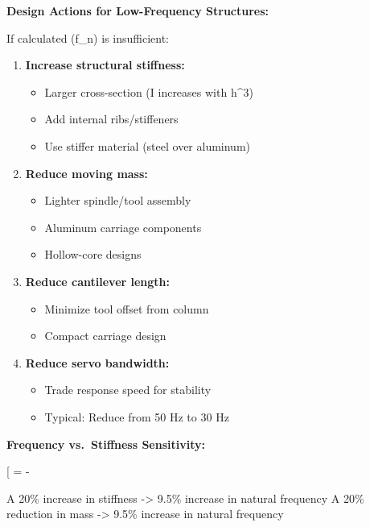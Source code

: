 \documentclass[
]{article}
\providecommand{\tightlist}{%
  \setlength{\itemsep}{0pt}\setlength{\parskip}{0pt}}
\begin{document}
\textbf{Design Actions for Low-Frequency Structures:}

If calculated (f\_n) is insufficient:

\begin{enumerate}
\def\labelenumi{\arabic{enumi}.}
\tightlist
\item
  \textbf{Increase structural stiffness:}

  \begin{itemize}
  \tightlist
  \item
    Larger cross-section (I increases with h\^{}3)
  \item
    Add internal ribs/stiffeners
  \item
    Use stiffer material (steel over aluminum)
  \end{itemize}
\item
  \textbf{Reduce moving mass:}

  \begin{itemize}
  \tightlist
  \item
    Lighter spindle/tool assembly
  \item
    Aluminum carriage components
  \item
    Hollow-core designs
  \end{itemize}
\item
  \textbf{Reduce cantilever length:}

  \begin{itemize}
  \tightlist
  \item
    Minimize tool offset from column
  \item
    Compact carriage design
  \end{itemize}
\item
  \textbf{Reduce servo bandwidth:}

  \begin{itemize}
  \tightlist
  \item
    Trade response speed for stability
  \item
    Typical: Reduce from 50 Hz to 30 Hz
  \end{itemize}
\end{enumerate}

\textbf{Frequency vs.~Stiffness Sensitivity:}

{[} =  -
\frac{dm}{m}{]}

A 20\% increase in stiffness -\textgreater{} 9.5\% increase in natural
frequency A 20\% reduction in mass -\textgreater{} 9.5\% increase in
natural frequency
\end{document}
